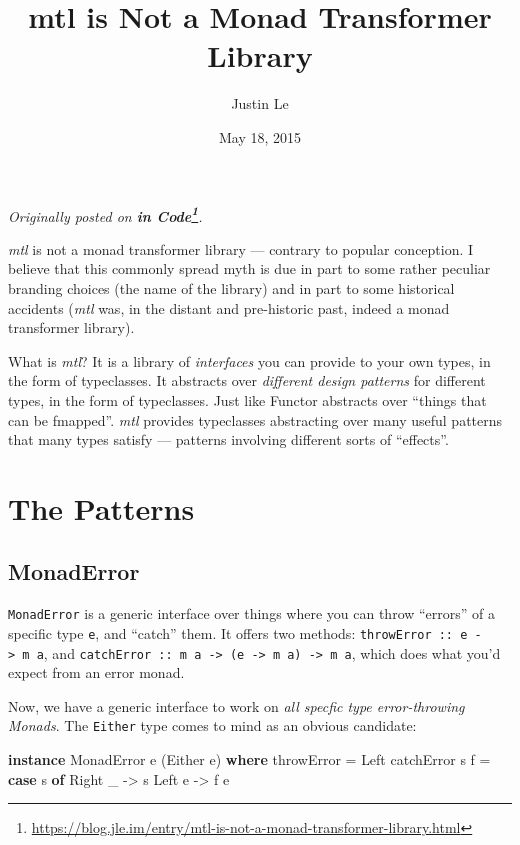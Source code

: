 \documentclass[]{article}
\title{mtl is Not a Monad Transformer Library}
\author{Justin Le}
\date{May 18, 2015}
\newenvironment{Shaded}{}{}
\newcommand{\KeywordTok}[1]{\textcolor[rgb]{0.00,0.44,0.13}{\textbf{#1}}}
\newcommand{\DataTypeTok}[1]{\textcolor[rgb]{0.56,0.13,0.00}{#1}}
\newcommand{\OtherTok}[1]{\textcolor[rgb]{0.00,0.44,0.13}{#1}}
\newcommand{\FunctionTok}[1]{\textcolor[rgb]{0.02,0.16,0.49}{#1}}
\newcommand{\NormalTok}[1]{#1}
\renewcommand{\href}[2]{#2\footnote{\url{#1}}}
\begin{document}
\maketitle

\emph{Originally posted on
\textbf{\href{https://blog.jle.im/entry/mtl-is-not-a-monad-transformer-library.html}{in
Code}}.}

\emph{mtl} is not a monad transformer library --- contrary to popular
conception. I believe that this commonly spread myth is due in part to some
rather peculiar branding choices (the name of the library) and in part to some
historical accidents (\emph{mtl} was, in the distant and pre-historic past,
indeed a monad transformer library).

What is \emph{mtl}? It is a library of \emph{interfaces} you can provide to your
own types, in the form of typeclasses. It abstracts over \emph{different design
patterns} for different types, in the form of typeclasses. Just like Functor
abstracts over ``things that can be fmapped''. \emph{mtl} provides typeclasses
abstracting over many useful patterns that many types satisfy --- patterns
involving different sorts of ``effects''.

\section{The Patterns}\label{the-patterns}

\subsection{MonadError}\label{monaderror}

\texttt{MonadError} is a generic interface over things where you can throw
``errors'' of a specific type \texttt{e}, and ``catch'' them. It offers two
methods: \texttt{throwError\ ::\ e\ -\textgreater{}\ m\ a}, and
\texttt{catchError\ ::\ m\ a\ -\textgreater{}\ (e\ -\textgreater{}\ m\ a)\ -\textgreater{}\ m\ a},
which does what you'd expect from an error monad.

Now, we have a generic interface to work on \emph{all specfic type
error-throwing Monads}. The \texttt{Either} type comes to mind as an obvious
candidate:

\begin{Shaded}
\begin{Highlighting}[]
\KeywordTok{instance} \DataTypeTok{MonadError}\NormalTok{ e (}\DataTypeTok{Either}\NormalTok{ e) }\KeywordTok{where}
\NormalTok{    throwError }\FunctionTok{=} \DataTypeTok{Left}
\NormalTok{    catchError s f }\FunctionTok{=} \KeywordTok{case}\NormalTok{ s }\KeywordTok{of}
                       \DataTypeTok{Right}\NormalTok{ _ }\OtherTok{->}\NormalTok{ s}
                       \DataTypeTok{Left}\NormalTok{ e  }\OtherTok{->}\NormalTok{ f e}
\end{Highlighting}
\end{Shaded}
\end{document}
